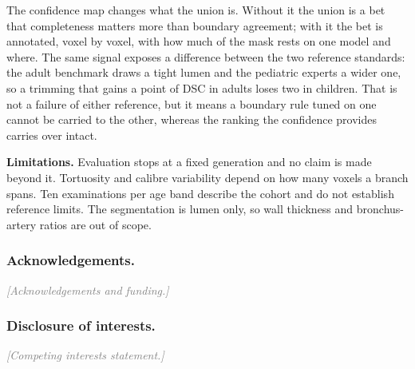 \documentclass[runningheads]{llncs}
\newcommand{\todo}[1]{\textcolor{gray}{\textit{[#1]}}}
\begin{document}
The confidence map changes what the union is. Without it the union is a bet
that completeness matters more than boundary agreement; with it the bet is
annotated, voxel by voxel, with how much of the mask rests on one model and
where. The same signal exposes a difference between the two reference
standards: the adult benchmark draws a tight lumen and the pediatric experts a
wider one, so a trimming that gains a point of DSC in adults loses two in
children. That is not a failure of either reference, but it means a boundary
rule tuned on one cannot be carried to the other, whereas the ranking the
confidence provides carries over intact.

\smallskip\noindent\textbf{Limitations.}
Evaluation stops at a fixed generation and no claim
is made beyond it. Tortuosity and calibre variability depend on how many voxels
a branch spans. Ten examinations per age band describe the cohort and do not
establish reference limits. The segmentation is lumen only, so wall thickness
and bronchus-artery ratios are out of scope.

\subsubsection*{Acknowledgements.} \todo{Acknowledgements and funding.}

\subsubsection*{Disclosure of interests.} \todo{Competing interests statement.}



\end{document}

